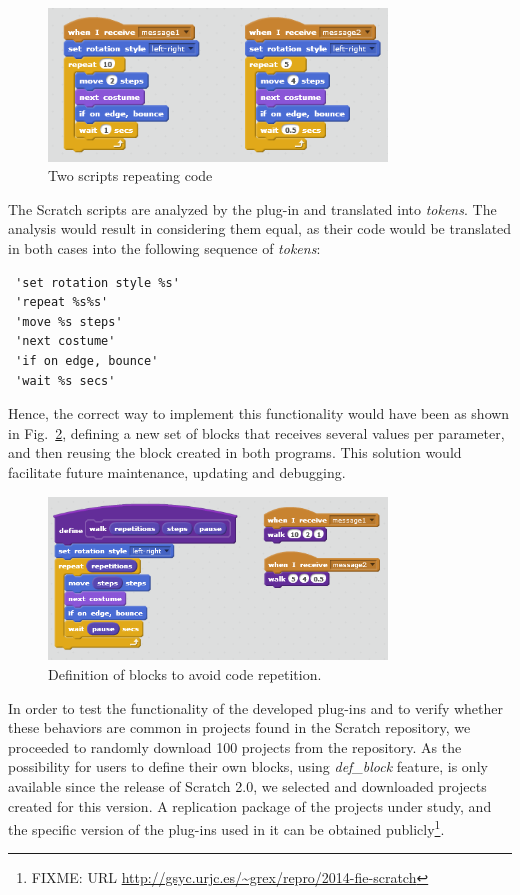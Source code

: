 \documentclass[conference]{format/IEEEtran}
\begin{document}
\begin{enumerate}
\begin{figure}
  \centering
    \includegraphics[width=9cm]{img/CodeRepetition1.png}
  \caption{Two scripts repeating code}
  \label{fig:CodeRepetition1}
\end{figure}


The Scratch scripts are analyzed by the plug-in and translated into \textit{tokens}. The analysis would result in considering them equal, as their code would be translated in both cases into the following sequence of \textit{tokens}:
\begin{verbatim}
 'set rotation style %s'
 'repeat %s%s'
 'move %s steps'
 'next costume'
 'if on edge, bounce'
 'wait %s secs'
\end{verbatim}

Hence, the correct way to implement this functionality would have been as shown in Fig.~\ref{fig:CodeRepetition2}, defining a new set of blocks that receives several values per parameter, and then reusing the block created in both programs. This solution would facilitate future maintenance, updating and debugging.

\begin{figure}
  \centering
    \includegraphics[width=9cm]{img/CodeRepetition2.png}
  \caption{Definition of blocks to avoid code repetition.}
  \label{fig:CodeRepetition2}
\end{figure}

\end{enumerate}


In order to test the functionality of the developed plug-ins and to verify whether these behaviors are common in projects found in the Scratch repository, we proceeded to randomly download 100 projects from the repository. As the possibility for users to define their own blocks, using \textit{def\_block} feature, is only available since the release of Scratch 2.0, we selected and downloaded projects created for this version. A replication package of the projects under study, and the specific version of the plug-ins used in it can be obtained publicly\footnote{FIXME: URL \url{http://gsyc.urjc.es/~grex/repro/2014-fie-scratch}}.
\end{document}
